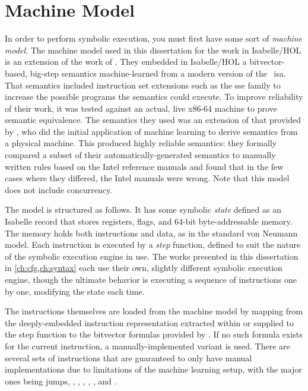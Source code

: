 \section{Machine Model}\label{se:machine_model}
In order to perform symbolic execution,
you must first have some sort of \emph{machine model}.%
The machine model used in this dissertation for the work in Isabelle/HOL
is an extension of the work of \textcite{roessle2019}.
They embedded in Isabelle/HOL a bitvector-based, big-step semantics
machine-learned from a modern version of the \arch\ \ac{isa}.
That semantics included instruction set extensions such as the \ac{sse} family
to increase the possible programs the semantics could execute.
To improve reliability of their work,
it was tested against an actual, live x86-64 machine to prove semantic equivalence.
The semantics they used was an extension of that provided by \textcite{heule2016stratified},
who did the initial application of machine learning
to derive semantics from a physical machine.
This produced highly reliable semantics:
they formally compared a subset of their automatically-generated semantics
to manually written rules based on the Intel reference manuals
and found that in the few cases where they differed, the Intel manuals were wrong.
Note that this model does not include concurrency.

The model is structured as follows.
It has some symbolic \emph{state} defined as an Isabelle record
that stores registers, flags, and 64-bit byte-addressable memory.
The memory holds both instructions and data, as in the standard von Neumann model.%
Each instruction is executed by a \emph{step} function,%
defined to suit the nature of the symbolic execution engine in use.
The works presented in this dissertation in \cref{ch:cfg,ch:syntax}
each use their own, slightly different symbolic execution engine,
though the ultimate behavior is executing a sequence of instructions one by one,
modifying the state each time.

The instructions themselves are loaded from the machine model
by mapping from the deeply-embedded instruction representation
extracted within or supplied to the step function
to the bitvector formulas provided by \textcite{roessle2019}.
If no such formula exists for the current instruction,
a manually-implemented variant is used.
There are several sets of instructions
that are guaranteed to only have manual implementations due to limitations
of the machine learning setup, with the major ones being
jumps, , , , ,
, and .

